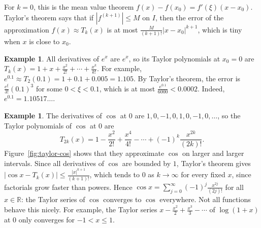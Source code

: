 \documentclass[11pt]{article}
\theoremstyle{definition}
\newtheorem{example}[definition]{Example}
\theoremstyle{plain}
\theoremstyle{remark}
\begin{document}
For $k = 0$, this is the mean value theorem $f(x) - f(x_0) = f'(\xi)(x - x_0)$. Taylor's theorem says that if $|f^{(k+1)}| \leq M$ on $I$, then the error of the approximation $f(x) \approx T_k(x)$ is at most $\frac{M}{(k+1)!}|x - x_0|^{k+1}$, which is tiny when $x$ is close to $x_0$.

\begin{example}\label{ex:taylor-exp}
    All derivatives of $e^x$ are $e^x$, so its Taylor polynomials at $x_0 = 0$ are $T_k(x) = 1 + x + \frac{x^2}{2!} + \cdots + \frac{x^k}{k!}$. For example, $e^{0.1} \approx T_2(0.1) = 1 + 0.1 + 0.005 = 1.105$. By Taylor's theorem, the error is $\frac{e^\xi}{3!} (0.1)^3$ for some $0 < \xi < 0.1$, which is at most $\frac{e^{0.1}}{6000} < 0.0002$. Indeed, $e^{0.1} = 1.10517\ldots$.
\end{example}

\begin{example}\label{ex:taylor-cos}
    The derivatives of $\cos$ at $0$ are $1, 0, -1, 0, 1, 0, -1, 0, \ldots$, so the Taylor polynomials of $\cos$ at $0$ are
    \[T_{2k}(x) = 1 - \frac{x^2}{2!} + \frac{x^4}{4!} - \cdots + (-1)^k \frac{x^{2k}}{(2k)!}.\]
    Figure~\ref{fig:taylor-cos} shows that they approximate $\cos$ on larger and larger intervals. Since all derivatives of $\cos$ are bounded by $1$, Taylor's theorem gives $|\cos x - T_k(x)| \leq \frac{|x|^{k+1}}{(k+1)!}$, which tends to $0$ as $k \to \infty$ for every fixed $x$, since factorials grow faster than powers. Hence $\cos x = \sum_{j=0}^\infty (-1)^j \frac{x^{2j}}{(2j)!}$ for all $x \in \mathbb{R}$: the Taylor series of $\cos$ converges to $\cos$ everywhere. Not all functions behave this nicely. For example, the Taylor series $x - \frac{x^2}{2} + \frac{x^3}{3} - \cdots$ of $\log(1 + x)$ at $0$ only converges for $-1 < x \leq 1$.
\end{example}
\end{document}
